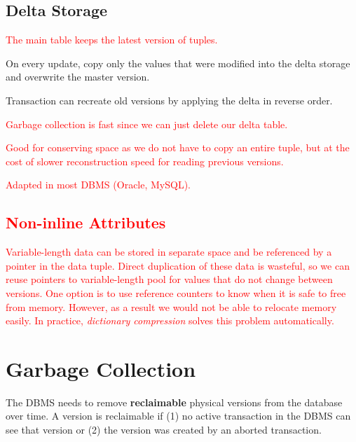 \documentclass[11pt]{article}
\newcommand{\rr}[1]{\textcolor{red}{#1}}
\begin{document}
\subsection*{Delta Storage}
\begin{itemize}
    \item \rr{The main table keeps the latest version of tuples.}
    \item
    On every update, copy only the values that were modified into the delta storage and 
    overwrite the master version.
    
    \item
    Transaction can recreate old versions by applying the delta in reverse order.
    \item \rr{Garbage collection is fast since we can just delete our delta table.
    \item Good for conserving space as we do not have to copy an entire tuple, but at the cost of slower reconstruction speed for reading previous versions.
    \item Adapted in most DBMS (Oracle, MySQL).}
\end{itemize}
\rr{\subsection*{Non-inline Attributes}
Variable-length data can be stored in separate space and be referenced by a pointer in the data tuple. Direct duplication of these data is wasteful, so we can reuse pointers to variable-length pool for values that do not change between versions. One option is to use reference counters to know when it is safe to free from memory. However, as a result we would not be able to relocate memory easily. In practice, \textit{dictionary compression} solves this problem automatically.}


\section{Garbage Collection}
The DBMS needs to remove \textbf{reclaimable} physical versions from the database over 
time. A version is reclaimable if (1) no active transaction in the DBMS can see that version or 
(2) the version was created by an aborted transaction.
\end{document}
